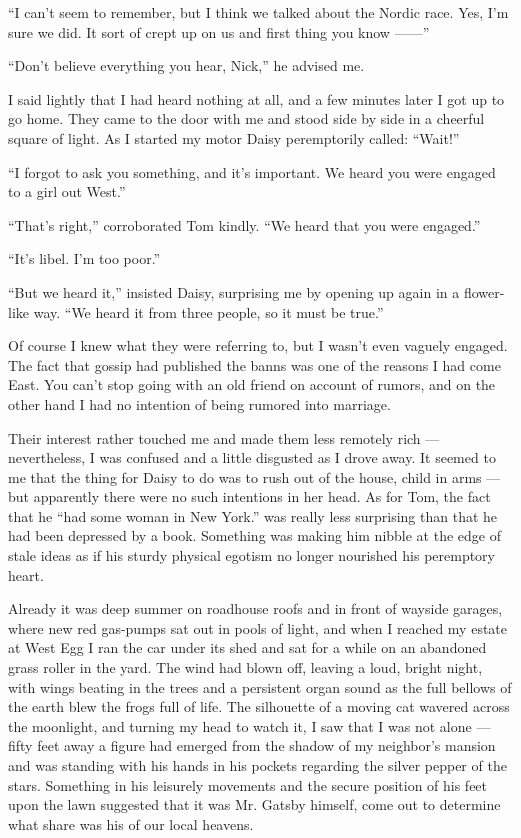 \documentclass{znotebook}
\begin{document}
``I can’t seem to remember, but I think we talked about the Nordic race. Yes, I’m sure we did. It sort of crept up on us and first thing you know ——''

``Don’t believe everything you hear, Nick,'' he advised me.

I said lightly that I had heard nothing at all, and a few minutes later I got up to go home. They came to the door with me and stood side by side in a cheerful square of light. As I started my motor Daisy peremptorily called: ``Wait!''

``I forgot to ask you something, and it’s important. We heard you were engaged to a girl out West.''

``That’s right,'' corroborated Tom kindly. ``We heard that you were engaged.''

``It’s libel. I’m too poor.''

``But we heard it,'' insisted Daisy, surprising me by opening up again in a flower-like way. ``We heard it from three people, so it must be true.''

Of course I knew what they were referring to, but I wasn’t even vaguely engaged. The fact that gossip had published the banns was one of the reasons I had come East. You can’t stop going with an old friend on account of rumors, and on the other hand I had no intention of being rumored into marriage.

Their interest rather touched me and made them less remotely rich — nevertheless, I was confused and a little disgusted as I drove away. It seemed to me that the thing for Daisy to do was to rush out of the house, child in arms — but apparently there were no such intentions in her head. As for Tom, the fact that he ``had some woman in New York.'' was really less surprising than that he had been depressed by a book. Something was making him nibble at the edge of stale ideas as if his sturdy physical egotism no longer nourished his peremptory heart.

Already it was deep summer on roadhouse roofs and in front of wayside garages, where new red gas-pumps sat out in pools of light, and when I reached my estate at West Egg I ran the car under its shed and sat for a while on an abandoned grass roller in the yard. The wind had blown off, leaving a loud, bright night, with wings beating in the trees and a persistent organ sound as the full bellows of the earth blew the frogs full of life. The silhouette of a moving cat wavered across the moonlight, and turning my head to watch it, I saw that I was not alone — fifty feet away a figure had emerged from the shadow of my neighbor’s mansion and was standing with his hands in his pockets regarding the silver pepper of the stars. Something in his leisurely movements and the secure position of his feet upon the lawn suggested that it was Mr. Gatsby himself, come out to determine what share was his of our local heavens.
\end{document}

